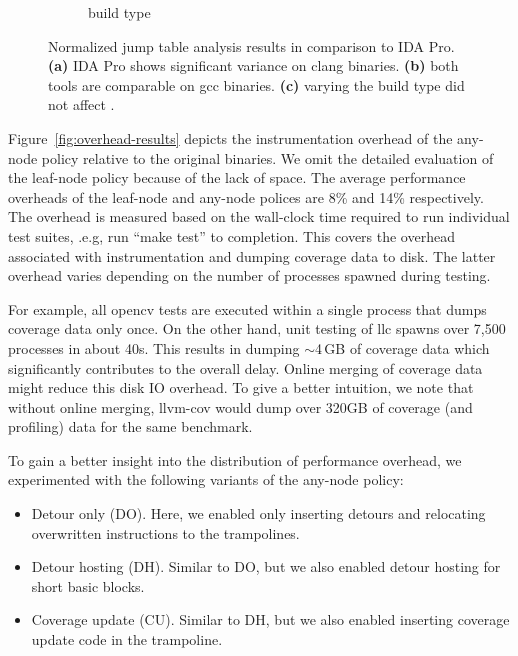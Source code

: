 \begin{figure}[t!]
\begin{subfigure}[t]{0.28\textwidth}
		\caption{build type}
		\label{fig:jumptab-build-type}
	\end{subfigure}
	
	\caption{Normalized jump table analysis results in comparison to IDA Pro. \textbf{(a)} IDA Pro shows significant  variance on \textsf{clang} binaries. \textbf{(b)} both tools are comparable on \textsf{gcc} binaries. \textbf{(c)} varying the build type did not affect {\bcov}.}
	\label{fig:jumptab-results}
\end{figure}

Figure~\ref{fig:overhead-results} depicts the instrumentation overhead of the any-node policy relative to the original binaries. 
We omit the detailed evaluation of the leaf-node policy because of the lack of space.
The average performance overheads of the leaf-node and any-node polices are 8\% and 14\% respectively.
The overhead is measured based on the wall-clock time required to run individual test suites, .e.g, run ``\textsf{make test}'' to completion.
This covers the overhead associated with instrumentation and dumping coverage data to disk.
The latter overhead varies depending on the number of processes spawned during testing.

For example, all \textsf{opencv} tests are executed within a single process that dumps coverage data only once.
On the other hand, unit testing of \textsf{llc} spawns over 7,500 processes in about 40s.
This results in dumping $\sim$4\,GB of coverage data which significantly contributes to the overall delay.
Online merging of coverage data might reduce this disk IO overhead.
To give a better intuition, we note that without online merging, \textsf{llvm-cov} would dump over 320GB of coverage (and profiling) data for the same benchmark. 

To gain a better insight into the distribution of performance overhead, we experimented with the following variants of the any-node policy:

\begin{itemize}
	\item Detour only (DO). Here, we enabled only inserting detours and relocating overwritten instructions to the trampolines.
	\item Detour hosting (DH). Similar to DO, but we also enabled detour hosting for short basic blocks.
	\item Coverage update (CU). Similar to DH, but we also enabled inserting coverage update code in the trampoline. 
\end{itemize}

